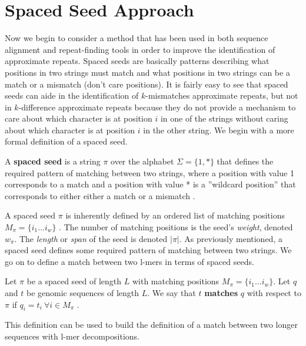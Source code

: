 \section{Spaced Seed Approach}
Now we begin to consider a method that has been used in both sequence alignment and repeat-finding tools in order to improve the identification of approximate repeats. Spaced seeds are basically patterns describing what positions in two strings must match and what positions in two strings can be a match or a mismatch (don't care positions). It is fairly easy to see that spaced seeds can aide in the identification of $k$-mismatches approximate repeats, but not in $k$-difference approximate repeats because they do not provide a mechanism to care about which character is at position $i$ in one of the strings without caring about which character is at position $i$ in the other string. We begin with a more formal definition of a spaced seed.

\begin{defn}
A \textbf{spaced seed} is a string $\pi$ over the alphabet $\Sigma =\lbrace 1,* \rbrace$ that defines the required pattern of matching between two strings, where
a position with value 1 corresponds to a match and a position with value * is a ”wildcard position” that corresponds to either
either a match or a mismatch \cite{chao2008sequence}. \end{defn}

A spaced seed $\pi$ is inherently defined by an ordered list of matching positions $M_{\pi} = \lbrace i_{1} \dotsc i_{w} \rbrace$ \cite{buhler2005designing}. The number of matching positions is the seed's \textit{weight}, denoted $w_{\pi}$. The \textit{length} or \textit{span} of the seed is denoted $\lvert \pi \rvert$. As previously mentioned, a spaced seed defines some required pattern of matching between two strings. We go on to define a match between two l-mers in terms of spaced seeds. 

\begin{defn}
Let $\pi$ be a spaced seed of length $L$ with matching positions $M_{\pi} = \lbrace i_{1} \dotsc i_{w} \rbrace$. Let $q$ and $t$ be genomic sequences of length $L$. We say that $t$ \textbf{matches} $q$ with respect to $\pi$ if $q_{i} = t_{i} \ \forall i \in M_{\pi}$ \cite{buhler2005designing}.
\end{defn}

This definition can be used to build the definition of a match between two longer sequences with l-mer decompositions.

